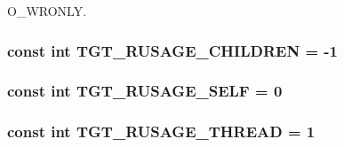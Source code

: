 O\_\-WRONLY. \hypertarget{classAlphaTru64_a9a340e7463be441b8aeb8ea0a109e1bc}{
\subsubsection[{TGT\_\-RUSAGE\_\-CHILDREN}]{\setlength{\rightskip}{0pt plus 5cm}const int {\bf TGT\_\-RUSAGE\_\-CHILDREN} = -\/1}}
\label{classAlphaTru64_a9a340e7463be441b8aeb8ea0a109e1bc}
\hypertarget{classAlphaTru64_a9e303b6c52672934210e6db497f0da88}{
\subsubsection[{TGT\_\-RUSAGE\_\-SELF}]{\setlength{\rightskip}{0pt plus 5cm}const int {\bf TGT\_\-RUSAGE\_\-SELF} = 0}}
\label{classAlphaTru64_a9e303b6c52672934210e6db497f0da88}
\hypertarget{classAlphaTru64_af35ba23c7e13a2929bc932a00b2f5c91}{
\subsubsection[{TGT\_\-RUSAGE\_\-THREAD}]{\setlength{\rightskip}{0pt plus 5cm}const int {\bf TGT\_\-RUSAGE\_\-THREAD} = 1}}
\label{classAlphaTru64_af35ba23c7e13a2929bc932a00b2f5c91}


